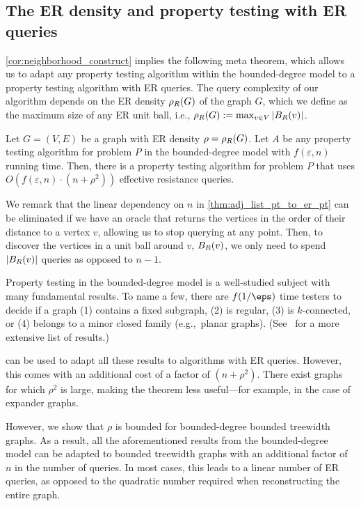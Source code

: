 \subsection{The ER density and property testing with ER queries} \cref{cor:neighborhood_construct} implies the following meta theorem, which allows us to adapt any property testing algorithm within the
bounded-degree model to a property testing algorithm with ER queries.  
The query complexity of our algorithm depends on the ER density $\rho_{R}(G)$ of the graph $G$, which we define as the maximum size of any ER unit ball, i.e., $\rho_{R}(G) := \max_{v\in V}{|B_{R}(v)|}$.

\begin{theorem}
\label{thm:adj_list_pt_to_er_pt}
    Let $G=(V,E)$ be a graph with ER density $\rho = \rho_{R}(G)$.  Let $A$ be any property testing algorithm for problem $P$ in the bounded-degree model with $f(\varepsilon, n)$ running time.  Then, there is a property testing algorithm for problem $P$ that uses $O(f(\varepsilon, n)\cdot (n+\rho^2))$ effective resistance queries.
\end{theorem}

\begin{remark}
We remark that the linear dependency on $n$ in 
 \cref{thm:adj_list_pt_to_er_pt} can be eliminated if we have an oracle that returns the vertices in the order of their distance to a vertex $v$, allowing us to stop querying at any point.   Then, to discover the vertices in a unit ball around $v$, $B_{R}(v)$, we only need to spend $|B_{R}(v)|$ queries as opposed to $n-1$.
\end{remark}

Property testing in the bounded-degree model is a well-studied subject with many fundamental results.  To name a few, there are $f(1/\eps)$ time testers to decide if a graph (1) contains a fixed subgraph, (2) is regular, (3) is $k$-connected, or (4) belongs to a minor closed family (e.g.,~planar graphs). (See~\citet{books/cu/Goldreich17} for a more extensive list of results.)

 can be used to adapt all these results to algorithms with ER queries. However, this comes with an additional cost of a factor of $(n + \rho^2)$. There exist graphs for which $\rho^2$ is large, making the theorem less useful—for example, in the case of expander graphs.

However, we show that $\rho$ is bounded for bounded-degree bounded treewidth graphs. As a result, all the aforementioned results from the bounded-degree model can be adapted to bounded treewidth graphs with an additional factor of $n$ in the number of queries. In most cases, this leads to a linear number of ER queries, as opposed to the quadratic number required when reconstructing the entire graph.
